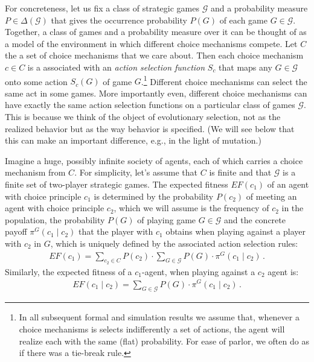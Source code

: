 \documentclass[fleqn,reqno,11pt]{article}
\begin{document}
For concreteness, let us fix a class of strategic games $\mathcal{G}$ and a probability measure
$P \in \Delta(\mathcal{G})$ that gives the occurrence probability $P(G)$ of each game
$G \in \mathcal{G}$. Together, a class of games and a probability measure over it can be
thought of as a model of the environment in which different choice mechanisms compete. Let $C$
the a set of choice mechanisms that we care about. Then each choice mechanism $c \in C$ is a
associated with an \emph{action selection function} $S_c$ that maps any $G \in \mathcal{G}$
onto some action $S_c(G)$ of game $G$.\footnote{In all subsequent formal and simulation results
  we assume that, whenever a choice mechanisms is selects indifferently a set of actions, the
  agent will realize each with the same (flat) probability. For ease of parlor, we often do as
  if there was a tie-break rule.} Different choice mechanisms can select the same act in some
games. More importantly even, different choice mechanisms can have exactly the same action
selection functions on a particular class of games $\mathcal{G}$. This is because we think of
the object of evolutionary selection, not as the realized behavior but as the way behavior is
specified. (We will see below that this can make an important difference, e.g., in the light of
mutation.)

Imagine a huge, possibly infinite society of agents, each of which carries a choice mechanism
from $C$. For simplicity, let's assume that $C$ is finite and that $\mathcal{G}$ is
a finite set of two-player strategic games. The expected fitness $EF(c_1)$ of an agent with
choice principle $c_1$ is determined by the probability $P(c_2)$ of meeting an agent with
choice principle $c_2$, which we will assume is the frequency of $c_2$ in the population, the
probability $P(G)$ of playing game $G \in \mathcal{G}$ and the concrete payoff
$\pi^G(c_1 \mid c_2)$ that the player with $c_1$ obtains when playing against a player with
$c_2$ in $G$, which is uniquely defined by the associated action selection rules:
\begin{align*}
  EF(c_1) = \sum_{c_2 \in C} P(c_2) \cdot \sum_{G \in \mathcal{G}}  P(G) \cdot \pi^G(c_1 \mid c_2)\,.
\end{align*}
Similarly, the expected fitness of a $c_1$-agent, when playing against a $c_2$ agent is:
\begin{align}
  \label{eq:ExpectedPayoffs}
  EF(c_1 \mid c_2) = \sum_{G \in \mathcal{G}}  P(G) \cdot \pi^G(c_1 \mid c_2)\,.
\end{align}
\end{document}
